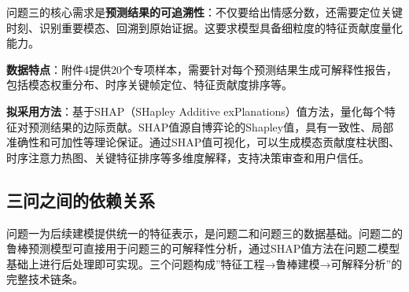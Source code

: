 问题三的核心需求是\textbf{预测结果的可追溯性}：不仅要给出情感分数，还需要定位关键时刻、识别重要模态、回溯到原始证据。这要求模型具备细粒度的特征贡献度量化能力。

\textbf{数据特点}：附件4提供20个专项样本，需要针对每个预测结果生成可解释性报告，包括模态权重分布、时序关键帧定位、特征贡献度排序等。

\textbf{拟采用方法}：基于SHAP（SHapley Additive exPlanations）值方法，量化每个特征对预测结果的边际贡献。SHAP值源自博弈论的Shapley值，具有一致性、局部准确性和可加性等理论保证。通过SHAP值可视化，可以生成模态贡献度柱状图、时序注意力热图、关键特征排序等多维度解释，支持决策审查和用户信任。

\subsection{三问之间的依赖关系}

问题一为后续建模提供统一的特征表示，是问题二和问题三的数据基础。问题二的鲁棒预测模型可直接用于问题三的可解释性分析，通过SHAP值方法在问题二模型基础上进行后处理即可实现。三个问题构成”特征工程→鲁棒建模→可解释分析”的完整技术链条。

